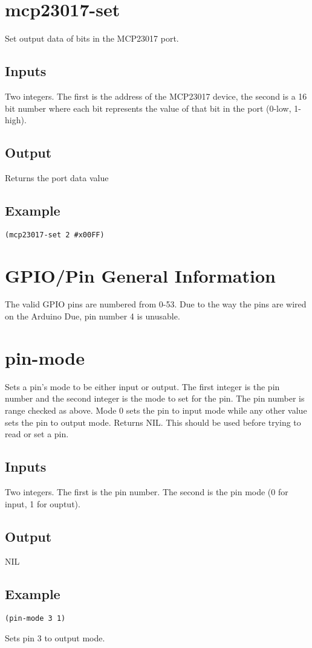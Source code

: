 \documentclass[10pt, openany]{book}
\begin{document}
\section{mcp23017-set}
Set output data of bits in the MCP23017 port.
\subsection{Inputs}
Two integers.  The first is the address of the MCP23017 device, the second is a 16 bit number where each bit represents the value of that bit in the port (0-low, 1-high).
\subsection{Output}
Returns the port data value
\subsection{Example}
\begin{lstlisting}
(mcp23017-set 2 #x00FF)
\end{lstlisting}

\section{GPIO/Pin General Information}
The valid GPIO pins are numbered from 0-53.  Due to the way the pins are wired on the Arduino Due, pin number 4 is unusable.

\section{pin-mode}
Sets a pin's mode to be either input or output.  The first integer is the pin number and the second integer is the mode to set for the pin.  The pin number is range checked as above.  Mode 0 sets the pin to input mode while any other value sets the pin to output mode.  Returns NIL.  This should be used before trying to read or set a pin.
\subsection{Inputs}
Two integers.  The first is the pin number.  The second is the pin mode (0 for input, 1 for ouptut).
\subsection{Output}
NIL
\subsection{Example}
\begin{lstlisting}
(pin-mode 3 1)
\end{lstlisting}
Sets pin 3 to output mode.
\end{document}
